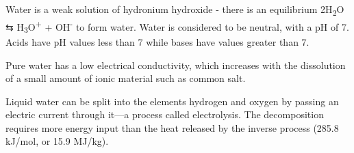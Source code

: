 Water is a weak solution of hydronium hydroxide - there is an equilibrium 2H\textsubscript{2}O ⇆
H\textsubscript{3}O\textsuperscript{+} + OH\textsuperscript{-} to form water. Water is considered to be neutral, with a pH of 7. Acids have pH values less than 7 while bases have values greater than 7.

Pure water has a low electrical conductivity, which increases with the dissolution of a small amount of ionic material such as common salt.

Liquid water can be split into the elements hydrogen and oxygen by passing an electric current through it---a process called electrolysis. The decomposition requires more energy input than the heat released by the inverse process (285.8 kJ/mol, or 15.9 MJ/kg).
